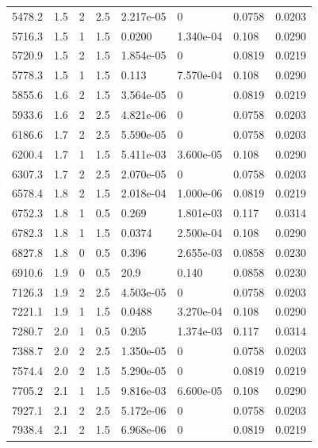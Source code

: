 \documentclass[preview]{standalone}
\begin{document}
{{\begin{tabular}{L{1.2cm}C{1.2cm} C{0.3cm}C{0.5cm} C{1.4cm}C{1.4cm} C{1.4cm}C{1.4cm}}
  5478.2  &   1.5  & 2     & 2.5 &  2.217e-05  & 0  & 0.0758 &  0.0203   \\ 
  5716.3  &   1.5  & 1     & 1.5 &  0.0200  & 1.340e-04  & 0.108 &  0.0290   \\ 
  5720.9  &   1.5  & 2     & 1.5 &  1.854e-05  & 0  & 0.0819 &  0.0219   \\ 
  5778.3  &   1.5  & 1     & 1.5 &  0.113  & 7.570e-04  & 0.108 &  0.0290   \\ 
  5855.6  &   1.6  & 2     & 1.5 &  3.564e-05  & 0  & 0.0819 &  0.0219   \\ 
  5933.6  &   1.6  & 2     & 2.5 &  4.821e-06  & 0  & 0.0758 &  0.0203   \\ 
  6186.6  &   1.7  & 2     & 2.5 &  5.590e-05  & 0  & 0.0758 &  0.0203   \\ 
  6200.4  &   1.7  & 1     & 1.5 &  5.411e-03  & 3.600e-05  & 0.108 &  0.0290   \\ 
  6307.3  &   1.7  & 2     & 2.5 &  2.070e-05  & 0  & 0.0758 &  0.0203   \\ 
  6578.4  &   1.8  & 2     & 1.5 &  2.018e-04  & 1.000e-06  & 0.0819 &  0.0219   \\ 
  6752.3  &   1.8  & 1     & 0.5 &  0.269  & 1.801e-03  & 0.117 &  0.0314   \\ 
  6782.3  &   1.8  & 1     & 1.5 &  0.0374  & 2.500e-04  & 0.108 &  0.0290   \\ 
  6827.8  &   1.8  & 0     & 0.5 &  0.396  & 2.655e-03  & 0.0858 &  0.0230   \\ 
  6910.6  &   1.9  & 0     & 0.5 &  20.9  & 0.140  & 0.0858 &  0.0230   \\ 
  7126.3  &   1.9  & 2     & 2.5 &  4.503e-05  & 0  & 0.0758 &  0.0203   \\ 
  7221.1  &   1.9  & 1     & 1.5 &  0.0488  & 3.270e-04  & 0.108 &  0.0290   \\ 
  7280.7  &   2.0  & 1     & 0.5 &  0.205  & 1.374e-03  & 0.117 &  0.0314   \\ 
  7388.7  &   2.0  & 2     & 2.5 &  1.350e-05  & 0  & 0.0758 &  0.0203   \\ 
  7574.4  &   2.0  & 2     & 1.5 &  5.290e-05  & 0  & 0.0819 &  0.0219   \\ 
  7705.2  &   2.1  & 1     & 1.5 &  9.816e-03  & 6.600e-05  & 0.108 &  0.0290   \\ 
  7927.1  &   2.1  & 2     & 2.5 &  5.172e-06  & 0  & 0.0758 &  0.0203   \\ 
  7938.4  &   2.1  & 2     & 1.5 &  6.968e-06  & 0  & 0.0819 &  0.0219   \\ 

\end{tabular}}}
\end{document}
